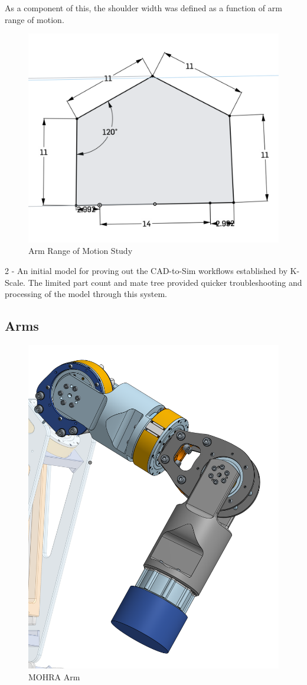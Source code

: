 \documentclass{article}
\begin{document}
As a component of this, the shoulder width was defined as a function of arm range of motion.
\begin{figure}
    \centering
    \includegraphics[width=0.75\linewidth]{assets/Skeleton/Rangeofmotionstudy.png}
    \caption{Arm Range of Motion Study}
    \label{fig:enter-label}
\end{figure}


2 - An initial model for proving out the CAD-to-Sim workflows established by K-Scale. The limited part count and mate tree provided quicker troubleshooting and processing of the model through this system.

\subsection{Arms}

\begin{figure}
    \centering
    \includegraphics[width=0.75\linewidth]{assets//MOHRA/MOHRA_Arm.png}
    \caption{MOHRA Arm}
    \label{fig:enter-label}
\end{figure}
\end{document}
